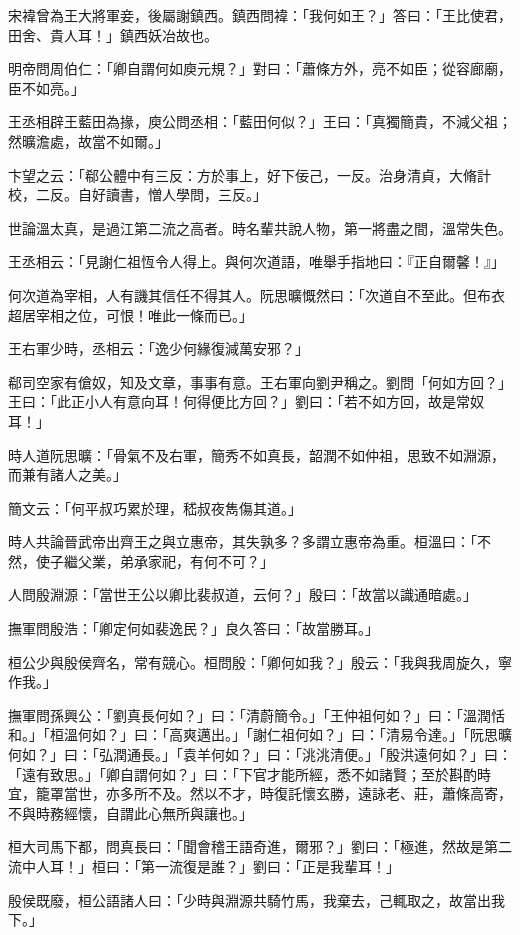 宋褘曾為王大將軍妾，後屬謝鎮西。鎮西問褘：「我何如王？」答曰：「王比使君，田舍、貴人耳！」鎮西妖冶故也。

明帝問周伯仁：「卿自謂何如庾元規？」對曰：「蕭條方外，亮不如臣；從容廊廟，臣不如亮。」

王丞相辟王藍田為掾，庾公問丞相：「藍田何似？」王曰：「真獨簡貴，不減父祖；然曠澹處，故當不如爾。」

卞望之云：「郗公體中有三反：方於事上，好下佞己，一反。治身清貞，大脩計校，二反。自好讀書，憎人學問，三反。」

世論溫太真，是過江第二流之高者。時名輩共說人物，第一將盡之間，溫常失色。

王丞相云：「見謝仁祖恆令人得上。與何次道語，唯舉手指地曰：『正自爾馨！』」

何次道為宰相，人有譏其信任不得其人。阮思曠慨然曰：「次道自不至此。但布衣超居宰相之位，可恨！唯此一條而已。」

王右軍少時，丞相云：「逸少何緣復減萬安邪？」

郗司空家有傖奴，知及文章，事事有意。王右軍向劉尹稱之。劉問「何如方回？」王曰：「此正小人有意向耳！何得便比方回？」劉曰：「若不如方回，故是常奴耳！」

時人道阮思曠：「骨氣不及右軍，簡秀不如真長，韶潤不如仲祖，思致不如淵源，而兼有諸人之美。」

簡文云：「何平叔巧累於理，嵇叔夜雋傷其道。」

時人共論晉武帝出齊王之與立惠帝，其失孰多？多謂立惠帝為重。桓溫曰：「不然，使子繼父業，弟承家祀，有何不可？」

人問殷淵源：「當世王公以卿比裴叔道，云何？」殷曰：「故當以識通暗處。」

撫軍問殷浩：「卿定何如裴逸民？」良久答曰：「故當勝耳。」

桓公少與殷侯齊名，常有競心。桓問殷：「卿何如我？」殷云：「我與我周旋久，寧作我。」

撫軍問孫興公：「劉真長何如？」曰：「清蔚簡令。」「王仲祖何如？」曰：「溫潤恬和。」「桓溫何如？」曰：「高爽邁出。」「謝仁祖何如？」曰：「清易令達。」「阮思曠何如？」曰：「弘潤通長。」「袁羊何如？」曰：「洮洮清便。」「殷洪遠何如？」曰：「遠有致思。」「卿自謂何如？」曰：「下官才能所經，悉不如諸賢；至於斟酌時宜，籠罩當世，亦多所不及。然以不才，時復託懷玄勝，遠詠老、莊，蕭條高寄，不與時務經懷，自謂此心無所與讓也。」

桓大司馬下都，問真長曰：「聞會稽王語奇進，爾邪？」劉曰：「極進，然故是第二流中人耳！」桓曰：「第一流復是誰？」劉曰：「正是我輩耳！」

殷侯既廢，桓公語諸人曰：「少時與淵源共騎竹馬，我棄去，己輒取之，故當出我下。」

